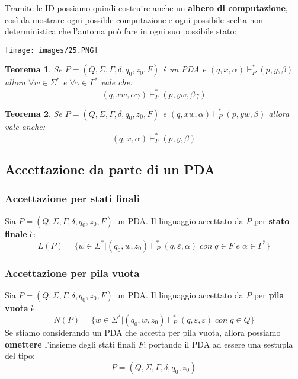 \documentclass[12pt]{article}
\newtheorem{Teorema}{Teorema}[subsection]
\begin{document}
Tramite le ID possiamo quindi costruire anche un \textbf{albero di computazione}, così da mostrare ogni possible computazione e ogni possibile scelta non deterministica che l'automa può fare in ogni suo possibile stato:
\begin{center}
    \texttt{[image: images/25.PNG]}
\end{center}
\begin{Teorema}
    Se $P = (Q, \Sigma, \Gamma, \delta, q_0, z_0, F)$ è un PDA e $(q, x, \alpha) \vdash^*_P (p, y, \beta)$ allora $\forall w \in \Sigma^*$ e $\forall \gamma \in \Gamma^*$ vale che:
    $$(q, xw, \alpha\gamma) \vdash^*_P (p, yw, \beta\gamma)$$
\end{Teorema}
\begin{Teorema}
    Se $P = (Q, \Sigma, \Gamma, \delta, q_0, z_0, F)$ e $(q, xw, \alpha) \vdash^*_P (p, yw, \beta)$ allora vale anche:
    $$(q, x, \alpha) \vdash^*_P (p, y, \beta)$$
\end{Teorema}
\subsection{Accettazione da parte di un PDA}
\subsubsection{Accettazione per stati finali}
Sia $P = (Q, \Sigma, \Gamma, \delta, q_0, z_0, F)$ un PDA. Il linguaggio accettato da $P$ per \textbf{stato finale} è:
$$L(P) = \{w \in \Sigma^*|(q_0, w, z_0) \vdash^*_P (q, \varepsilon, \alpha) \; con \; q \in F \; e \; \alpha \in \Gamma^*\}$$
\subsubsection{Accettazione per pila vuota}
Sia $P = (Q, \Sigma, \Gamma, \delta, q_0, z_0, F)$ un PDA. Il linguaggio accettato da $P$ per \textbf{pila vuota} è:
$$N(P) = \{w \in \Sigma^*|(q_0, w, z_0) \vdash^*_P (q, \varepsilon, \varepsilon) \; con \; q \in Q\}$$
Se stiamo considerando un PDA che accetta per pila vuota, allora possiamo \textbf{omettere} l'insieme degli stati finali $F$; portando il PDA ad essere una sestupla del tipo:
$$P = (Q, \Sigma, \Gamma, \delta, q_0, z_0)$$
\end{document}
